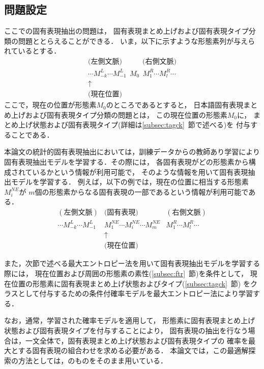 \subsection{問題設定}
\label{subsec:setting}

ここでの固有表現抽出の問題は，
固有表現まとめ上げおよび固有表現タイプ分類の問題ととらえることができる．
いま，以下に示すような形態素列が与えられているとする．
\[
\begin{array}{c}
\mbox{(左側文脈)}\ \ \ \ \ \ \ \  \ \ \ \ \ \mbox{(右側文脈)} \\
\cdots M_{-k}^L\cdots M_{-1}^L  \ \ 
	M_{0}\ \ 
         M_{1}^R\cdots M_{l}^R\cdots  \\
         \uparrow  \\
         \mbox{(現在位置)}  
\end{array}
\]
ここで，現在の位置が形態素$M_{0}$のところであるとすると，
日本語固有表現まとめ上げおよび固有表現タイプ分類の問題とは，
この現在位置の形態素$M_{0}$に，
まとめ上げ状態および固有表現タイプ(詳細は\ref{subsec:tagck}~節で述べる)を
付与することである．

本論文の統計的固有表現抽出においては，訓練データからの教師あり学習により
固有表現抽出モデルを学習する．その際には，
各固有表現がどの形態素から構成されているかという情報が利用可能で，
そのような情報を用いて固有表現抽出モデルを学習する．
例えば，以下の例では，現在の位置に相当する形態素$M_{i}^{NE}$が
$m$個の形態素からなる固有表現の一部であるという情報が利用可能である．
\newpage
{
\begin{eqnarray}
(左側文脈) & \mbox{(固有表現)} & (右側文脈) \nonumber\\
\cdots M_{-k}^L\cdots M_{-1}^L & 
        M_{1}^{NE}\cdots M_{i}^{NE}\cdots M_{m}^{NE}
        & M_{1}^R\cdots M_{l}^R\cdots  \nonumber \\
        & \uparrow\ \ \ & \label{eqn:NE-len} \\
        & \mbox{(現在位置)}\ \ \  & \nonumber
\end{eqnarray}
}

また，次節で述べる最大エントロピー法を用いて固有表現抽出モデルを学習する際には，
現在位置および周囲の形態素の素性(\ref{subsec:ftr}~節)を条件として，
現在位置の形態素に固有表現まとめ上げ状態およびタイプ(\ref{subsec:tagck}~節)
をクラスとして付与するための条件付確率モデルを最大エントロピー法により学習する．

なお，通常，学習された確率モデルを適用して，
形態素に固有表現まとめ上げ状態および固有表現タイプを付与することにより，
固有表現の抽出を行なう場合は，一文全体で，固有表現まとめ上げ状態および固有表現タイプの
確率を最大とする固有表現の組合わせを求める必要がある．
本論文では，この最適解探索の方法としては，\cite{Uchimoto00aj}のものをそのまま用いている．

